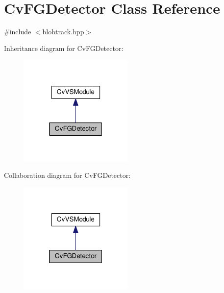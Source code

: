 \hypertarget{classCvFGDetector}{\section{Cv\-F\-G\-Detector Class Reference}
\label{classCvFGDetector}
}


{\ttfamily \#include $<$blobtrack.\-hpp$>$}



Inheritance diagram for Cv\-F\-G\-Detector\-:\nopagebreak
\begin{figure}[H]
\begin{center}
\leavevmode
\includegraphics[width=160pt]{classCvFGDetector__inherit__graph}
\end{center}
\end{figure}


Collaboration diagram for Cv\-F\-G\-Detector\-:\nopagebreak
\begin{figure}[H]
\begin{center}
\leavevmode
\includegraphics[width=160pt]{classCvFGDetector__coll__graph}
\end{center}
\end{figure}
